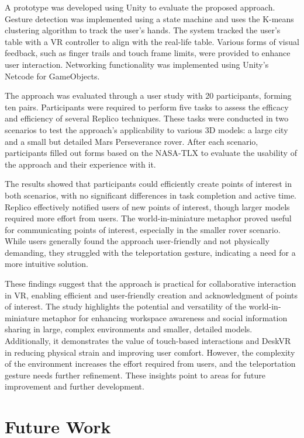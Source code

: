     A prototype was developed using Unity to evaluate the proposed approach. Gesture detection was implemented using a state machine and uses the K-means clustering algorithm to track the user's hands. The system tracked the user's table with a VR controller to align with the real-life table. Various forms of visual feedback, such as finger trails and touch frame limits, were provided to enhance user interaction. Networking functionality was implemented using Unity's Netcode for GameObjects.

    The approach was evaluated through a user study with 20 participants, forming ten pairs. Participants were required to perform five tasks to assess the efficacy and efficiency of several Replico techniques. These tasks were conducted in two scenarios to test the approach's applicability to various 3D models: a large city and a small but detailed Mars Perseverance rover. After each scenario, participants filled out forms based on the NASA-TLX to evaluate the usability of the approach and their experience with it.

    The results showed that participants could efficiently create points of interest in both scenarios, with no significant differences in task completion and active time. Replico effectively notified users of new points of interest, though larger models required more effort from users. The world-in-miniature metaphor proved useful for communicating points of interest, especially in the smaller rover scenario. While users generally found the approach user-friendly and not physically demanding, they struggled with the teleportation gesture, indicating a need for a more intuitive solution.

    These findings suggest that the approach is practical for collaborative interaction in VR, enabling efficient and user-friendly creation and acknowledgment of points of interest. The study highlights the potential and versatility of the world-in-miniature metaphor for enhancing workspace awareness and social information sharing in large, complex environments and smaller, detailed models. Additionally, it demonstrates the value of touch-based interactions and DeskVR in reducing physical strain and improving user comfort. However, the complexity of the environment increases the effort required from users, and the teleportation gesture needs further refinement. These insights point to areas for future improvement and further development.

\section{Future Work}


